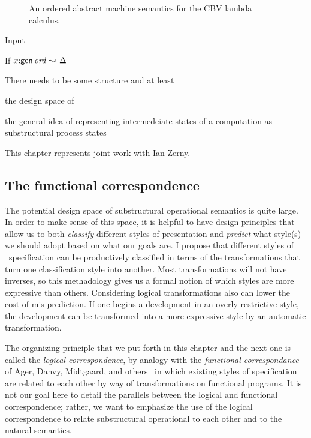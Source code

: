 \begin{figure}
\caption{An ordered abstract machine semantics for the CBV lambda calculus.}
\end{figure}

Input


\begin{theorem}
If $x{:}{\sf gen}\,{{\it ord}} \leadsto \Delta$
\end{theorem}

There needs to be some structure and
at least


the design space
of 

 the general idea
of representing intermedeiate states of a computation as 
substructural process states 

This chapter represents joint work with Ian Zerny.


\subsection{The functional correspondence}

The potential design space of substructural operational semantics is
quite large.  In order to make sense of this space, it is helpful to
have design principles that allow us to both {\it classify} different
styles of presentation and {\it predict} what style(s) we should adopt
based on what our goals are. I propose that different styles of
\sls~specification can be productively classified in terms of the
transformations that turn one classification style into another. Most
transformations will not have inverses, so this methadology gives us a
formal notion of which styles are more expressive than others.
Considering logical transformations also can lower the cost of
mis-prediction. If one begins a development in an overly-restrictive
style, the development can be transformed into a more expressive style
by an automatic transformation.

The organizing principle that we put forth in this chapter and the
next one is called the {\it logical correspondence}, by analogy with
the {\it functional correspondance} of Ager, Danvy, Midtgaard, and
others~\cite{ager03functional,ager04functional,ager05functional,
  danvy08defunctionalized} in which existing styles of specification
are related to each other by way of transformations on functional
programs. It is not our goal here to detail the parallels between the
logical and functional correspondence; rather, we want to emphasize
the use of the logical correspondence to relate substructural
operational to each other and to the natural semantics.

